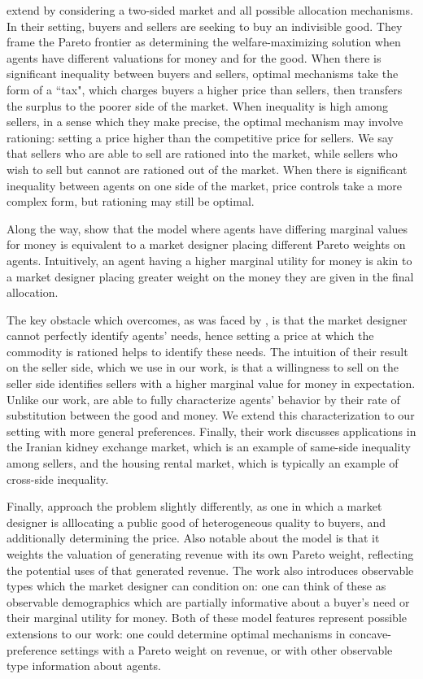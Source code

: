 \documentclass[AER]{AEA}
\begin{document}

\cite{dworczak-2020} extend \cite{weitzman-1977} by considering a two-sided market and all possible allocation mechanisms. In their setting, buyers and sellers are seeking to buy an indivisible good. They frame the Pareto frontier as determining the welfare-maximizing solution when agents have different valuations for money and for the good. When there is significant inequality between buyers and sellers, optimal mechanisms take the form of a ``tax", which charges buyers a higher price than sellers, then transfers the surplus to the poorer side of the market. When inequality is high among sellers, in a sense which they make precise, the optimal mechanism may involve rationing: setting a price higher than the competitive price for sellers. We say that sellers who are able to sell are rationed into the market, while sellers who wish to sell but cannot are rationed out of the market. When there is significant inequality between agents on one side of the market, price controls take a more complex form, but rationing may still be optimal.

Along the way, \cite{dworczak-2020} show that the model where agents have differing marginal values for money is equivalent to a market designer placing different Pareto weights on agents. Intuitively, an agent having a higher marginal utility for money is akin to a market designer placing greater weight on the money they are given in the final allocation. 

The key obstacle which \cite{dworczak-2020} overcomes, as was faced by \cite{weitzman-1977}, is that the market designer cannot perfectly identify agents' needs, hence setting a price at which the commodity is rationed helps to identify these needs. The intuition of their result on the seller side, which we use in our work, is that a willingness to sell on the seller side identifies sellers with a higher marginal value for money in expectation. Unlike our work, \cite{dworczak-2020} are able to fully characterize agents' behavior by their rate of substitution between the good and money. We extend this characterization to our setting with more general preferences. Finally, their work discusses applications in the Iranian kidney exchange market, which is an example of same-side inequality among sellers, and the housing rental market, which is typically an example of cross-side inequality.

Finally, \cite{akbarpour-2020} approach the problem slightly differently, as one in which a market designer is alllocating a public good of heterogeneous quality to buyers, and additionally determining the price. Also notable about the \cite{akbarpour-2020} model is that it weights the valuation of generating revenue with its own Pareto weight, reflecting the potential uses of that generated revenue. The work also introduces observable types which the market designer can condition on: one can think of these as observable demographics which are partially informative about a buyer's need or their marginal utility for money. Both of these model features represent possible extensions to our work: one could determine optimal mechanisms in concave-preference settings with a Pareto weight on revenue, or with other observable type information about agents.
\end{document}
